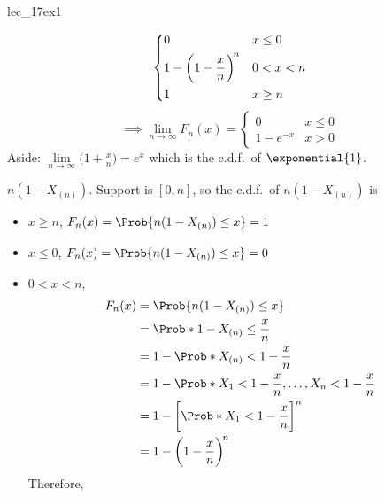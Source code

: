 \begin{Example}{}{lec_17ex1}
\begin{enumerate}[label=(\roman*)]
\begin{itemize}
\[\begin{dcases}
                                0                                    & x\le 0 \\
                                1-\biggl(1-\frac{x}{n} \biggr)^{\!n} & 0<x<n  \\
                                1                                    & x\ge n
                            \end{dcases} \]
                        \[ \implies
                            \lim\limits_{{n} \to {\infty}} F_n(x)=
                            \begin{cases}
                                0        & x\le 0 \\
                                1-e^{-x} & x>0
                            \end{cases} \]
                        Aside: $
                            \displaystyle  \lim\limits_{{n} \to {\infty}}\biggl(1+\frac{x}{n}\biggr)=
                            e^x $
                        which is the c.d.f.\ of $ \exponential{1} $.
              \end{itemize}
              $ n(1-X_{(n)}) $. Support is $ [0,n] $, so the c.d.f.\ of
              $ n(1-X_{(n)}) $ is
              \begin{itemize}
                  \item $ x\ge n $, $ F_n(x)=
                            \Prob{n(1-X_{(n)})\le x}=1 $
                  \item $ x\le 0 $, $ F_n(x)=
                            \Prob{n(1-X_{(n)})\le x}=0 $
                  \item $ 0<x<n $,
                        \begin{align*}
                            F_n(x)
                             & = \Prob{n(1-X_{(n)})\le x}                     \\
                             & =\Prob*{1-X_{(n)}\le \frac{x}{n}}              \\
                             & =1-\Prob*{X_{(n)}<1-\frac{x}{n}}               \\
                             & =1-\Prob*{X_1<1-\frac{x}{n},\ldots,
                            X_n<1-\frac{x}{n}}                                \\
                             & =1-\biggl[\Prob*{X_1<1-\frac{x}{n}}\biggr]^{n} \\
                             & =1-\biggl(1-\frac{x}{n}\biggr)^{\!n}
                        \end{align*}
                        Therefore,

\end{itemize}
\end{enumerate}
\end{Example}
